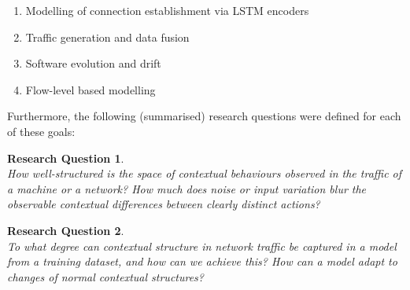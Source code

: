 \documentclass[a4paper,12pt,twoside]{article}
\newtheorem{rquestion}{Research Question}
\begin{document}
\begin{enumerate}
\item Modelling of connection establishment via LSTM encoders
\item Traffic generation and data fusion 
\item Software evolution and drift 
\item Flow-level based modelling
\end{enumerate}




Furthermore, the following (summarised) research questions were defined for each of these goals:

\begin{rquestion}\ \\ 
How well-structured is the space of contextual behaviours observed in the traffic of a machine or a network? How much does noise or input variation blur the observable contextual differences between clearly distinct actions?

\end{rquestion}



\begin{rquestion}\ \\
To what degree can contextual structure in network traffic be captured in a model from a training dataset, and how can we achieve this? How can a model adapt to changes of normal contextual structures?
\end{rquestion}
\end{document}
